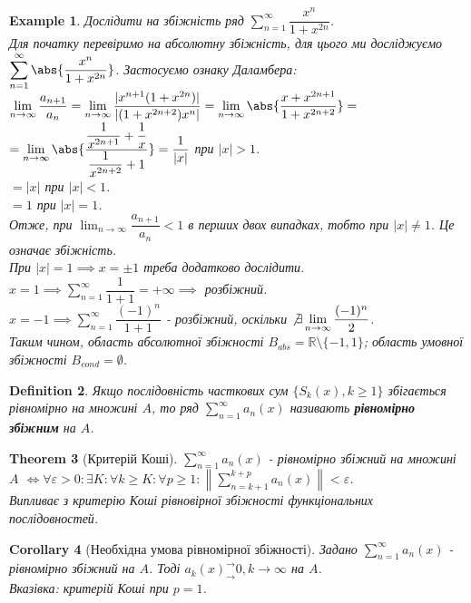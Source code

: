 \documentclass[a4paper, 10pt]{article}
\def\huge{\displaystyle}
\theoremstyle{theoremdd}
\newtheorem{theorem}{Theorem}[subsection]
\theoremstyle{theoremdd}
\theoremstyle{theoremdd}
\newtheorem{definition}[theorem]{Definition}
\theoremstyle{theoremdd}
\theoremstyle{theoremdd}
\newtheorem{example}[theorem]{Example}
\theoremstyle{theoremdd}
\theoremstyle{theoremdd}
\theoremstyle{theoremdd}
\theoremstyle{theoremdd}
\newtheorem{corollary}[theorem]{Corollary}
\begin{document}
\begin{example}
Дослідити на збіжність ряд $\huge\sum_{n=1}^\infty \dfrac{x^n}{1+x^{2n}}$.\\
Для початку перевіримо на абсолютну збіжність, для цього ми досліджуємо $\huge\sum_{n=1}^\infty \abs{\dfrac{x^n}{1+x^{2n}}}$. Застосуємо ознаку Даламбера:\\
$\huge\lim_{n \to \infty} \dfrac{a_{n+1}}{a_n} = \lim_{n \to \infty} \dfrac{|x^{n+1}(1+x^{2n})|}{|(1+x^{2n+2})x^n|} = \lim_{n \to \infty} \abs{ \dfrac{x+x^{2n+1}}{1+x^{2n+2}} } = $\\
$= \huge\lim_{n \to \infty} \abs{ \dfrac{\dfrac{1}{x^{2n+1}} + \dfrac{1}{x}}{\dfrac{1}{x^{2n+2}} + 1}} = \dfrac{1}{|x|}$ при $|x|>1$.\\
$= |x|$ при $|x| < 1$.\\
$= 1$ при $|x| = 1$.\\
Отже, при $\huge\lim_{n \to \infty} \dfrac{a_{n+1}}{a_n} < 1$ в перших двох випадках, тобто при $|x| \neq 1$. Це означає збіжність.\\
При $|x| = 1 \implies x = \pm 1$ треба додатково дослідити.\\
$x = 1 \implies \huge\sum_{n=1}^\infty \dfrac{1}{1+1} = +\infty \implies$ розбіжний.\\
$x = -1 \implies \huge\sum_{n=1}^\infty \dfrac{(-1)^n}{1+1}$ - розбіжний, оскільки $\not\exists \huge\lim_{n \to \infty} \dfrac{(-1)^n}{2}$.\\
Таким чином, область абсолютної збіжності $B_{abs} = \mathbb{R} \setminus \{-1,1\}$; область умовної збіжності $B_{cond} = \emptyset$.
\end{example}


\begin{definition}
Якщо послідовність часткових сум $\{S_k(x), k \geq 1\}$ збігається рівномірно на множині $A$, то ряд $\huge \sum_{n=1}^\infty a_n(x)$ називають \textbf{рівномірно збіжним} на $A$.
\end{definition}

\begin{theorem}[Критерій Коші]
$\huge \sum_{n=1}^\infty a_n(x)$ - рівномірно збіжний на множині $A$ $\iff \forall \varepsilon > 0: \exists K: \forall k \geq K: \forall p \geq 1: \left\lVert \huge\sum_{n=k+1}^{k+p} a_n(x)  \right\rVert < \varepsilon$.\\
\textit{Випливає з критерію Коші рівновірної збіжності функціональних послідовностей.}
\end{theorem}

\begin{corollary}[Необхідна умова рівномірної збіжності]
Задано $\huge\sum_{n=1}^\infty a_n(x)$ - рівномірно збіжний на $A$. Тоді $a_k(x)^\rightarrow_\rightarrow 0, k \to \infty$ на $A$.\\
\textit{Вказівка: критерій Коші при $p = 1$.}
\end{corollary}
\end{document}
